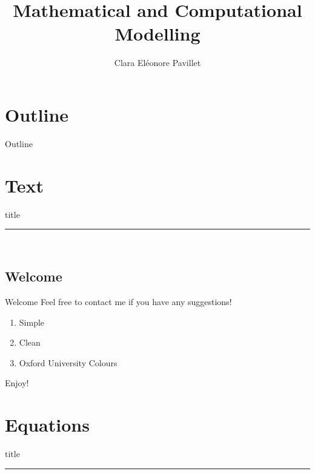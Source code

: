 \documentclass{beamer}
\title{Mathematical and Computational Modelling}
\author{Clara El{\'e}onore Pavillet}
\institute{University of Oxford}
\date{} %
\begin{document}
{ 
\frame{\titlepage}}

\section*{Outline}\begin{frame}{Outline}\tableofcontents\end{frame}

\section{Text}
    \begin{frame}[plain]
        \vfill
      \centering
      \begin{beamercolorbox}[sep=8pt,center,shadow=true,rounded=true]{title}
        \insertsectionhead\par%
        \color{oxfordblue}\noindent\rule{10cm}{1pt} \\
        \LARGE{\faFileTextO}
      \end{beamercolorbox}
      \vfill
  \end{frame}


\subsection{Welcome}
\begin{frame}{Welcome}
Feel free to contact me if you have any suggestions! \href{https://github.com/CEPav}{\faGithub}

\begin{enumerate}
    \item Simple
    \item Clean
    \item Oxford University Colours
\end{enumerate}
\vspace{1cm}
\begin{center}
    Enjoy! \faSmileO
\end{center}
\end{frame}


\section{Equations}
    \begin{frame}[plain]
        \vfill
      \centering
      \begin{beamercolorbox}[sep=8pt,center,shadow=true,rounded=true]{title}
        \insertsectionhead\par%
        \color{oxfordblue}\noindent\rule{10cm}{1pt} \\
        \LARGE{\faFileTextO}
      \end{beamercolorbox}
      \vfill
  \end{frame}
  
\end{document}

